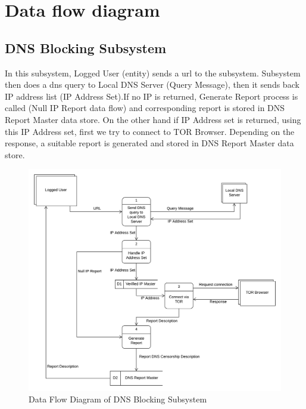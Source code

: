\documentclass[12pt]{article}
\begin{document}
\newpage
\section{Data flow diagram}

\subsection{DNS Blocking Subsystem}


In this subsystem, Logged User (entity) sends a url to the subsystem.
Subsystem then does a dns query to Local DNS Server (Query Message), then it sends back IP address list (IP Address Set).If no IP is returned, Generate Report process is called (Null IP Report data flow) and corresponding report is stored in DNS Report Master data store.
On the other hand if IP Address set is returned, using this IP Address set, first we try to connect to TOR Browser. Depending on the response, a suitable report is generated and stored in DNS Report Master data store.

\begin{figure}[H]
    \centering
    \includegraphics[width=\textwidth]{dfddns.png}
    \caption{Data Flow Diagram of DNS Blocking Subsystem}
    \label{fig:dfddns}
\end{figure}


\end{document}

